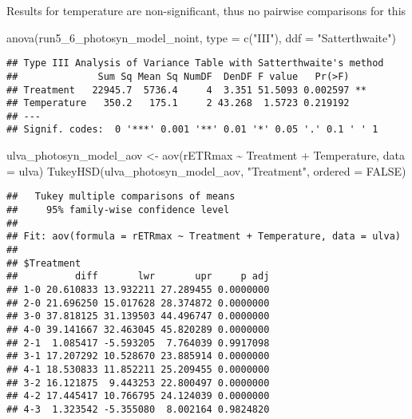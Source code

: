 \documentclass[
]{article}
\newenvironment{Shaded}{\begin{snugshade}}{\end{snugshade}}
\newcommand{\AttributeTok}[1]{\textcolor[rgb]{0.77,0.63,0.00}{#1}}
\newcommand{\ConstantTok}[1]{\textcolor[rgb]{0.00,0.00,0.00}{#1}}
\newcommand{\FunctionTok}[1]{\textcolor[rgb]{0.00,0.00,0.00}{#1}}
\newcommand{\NormalTok}[1]{#1}
\newcommand{\OtherTok}[1]{\textcolor[rgb]{0.56,0.35,0.01}{#1}}
\newcommand{\SpecialCharTok}[1]{\textcolor[rgb]{0.00,0.00,0.00}{#1}}
\newcommand{\StringTok}[1]{\textcolor[rgb]{0.31,0.60,0.02}{#1}}
\begin{document}
Results for temperature are non-significant, thus no pairwise
comparisons for this

\begin{Shaded}
\begin{Highlighting}[]
\FunctionTok{anova}\NormalTok{(run5\_6\_photosyn\_model\_noint, }\AttributeTok{type =} \FunctionTok{c}\NormalTok{(}\StringTok{"III"}\NormalTok{), }\AttributeTok{ddf =} \StringTok{"Satterthwaite"}\NormalTok{)}
\end{Highlighting}
\end{Shaded}

\begin{verbatim}
## Type III Analysis of Variance Table with Satterthwaite's method
##              Sum Sq Mean Sq NumDF  DenDF F value   Pr(>F)   
## Treatment   22945.7  5736.4     4  3.351 51.5093 0.002597 **
## Temperature   350.2   175.1     2 43.268  1.5723 0.219192   
## ---
## Signif. codes:  0 '***' 0.001 '**' 0.01 '*' 0.05 '.' 0.1 ' ' 1
\end{verbatim}

\begin{Shaded}
\begin{Highlighting}[]
\NormalTok{ulva\_photosyn\_model\_aov }\OtherTok{\textless{}{-}} \FunctionTok{aov}\NormalTok{(rETRmax }\SpecialCharTok{\textasciitilde{}}\NormalTok{ Treatment }\SpecialCharTok{+}\NormalTok{ Temperature, }\AttributeTok{data =}\NormalTok{ ulva)}
\FunctionTok{TukeyHSD}\NormalTok{(ulva\_photosyn\_model\_aov, }\StringTok{"Treatment"}\NormalTok{, }\AttributeTok{ordered =} \ConstantTok{FALSE}\NormalTok{)}
\end{Highlighting}
\end{Shaded}

\begin{verbatim}
##   Tukey multiple comparisons of means
##     95% family-wise confidence level
## 
## Fit: aov(formula = rETRmax ~ Treatment + Temperature, data = ulva)
## 
## $Treatment
##          diff       lwr       upr     p adj
## 1-0 20.610833 13.932211 27.289455 0.0000000
## 2-0 21.696250 15.017628 28.374872 0.0000000
## 3-0 37.818125 31.139503 44.496747 0.0000000
## 4-0 39.141667 32.463045 45.820289 0.0000000
## 2-1  1.085417 -5.593205  7.764039 0.9917098
## 3-1 17.207292 10.528670 23.885914 0.0000000
## 4-1 18.530833 11.852211 25.209455 0.0000000
## 3-2 16.121875  9.443253 22.800497 0.0000000
## 4-2 17.445417 10.766795 24.124039 0.0000000
## 4-3  1.323542 -5.355080  8.002164 0.9824820
\end{verbatim}
\end{document}
